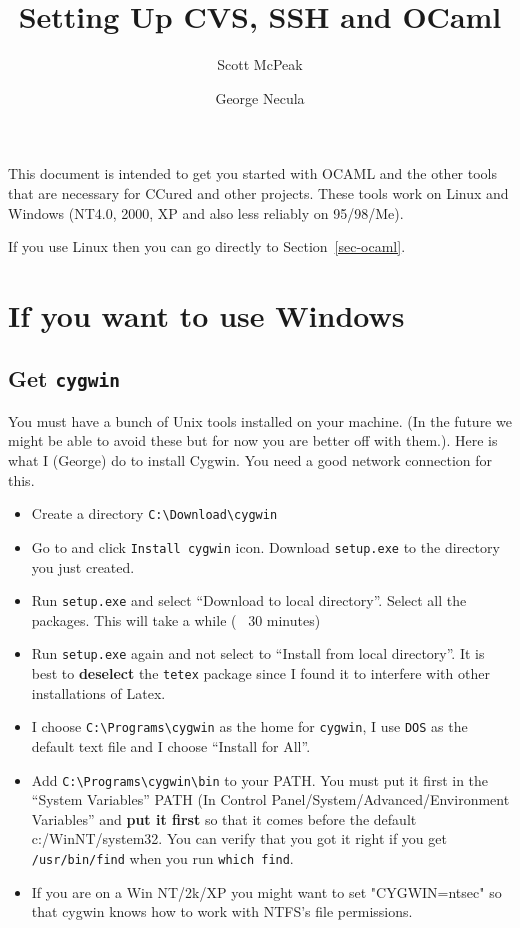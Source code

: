 \documentclass{article}
\title{Setting Up CVS, SSH and OCaml}
\author{Scott McPeak \and George Necula}
\def\t#1{{\tt #1}}
\begin{document}
\maketitle

 This document is intended to get you started with OCAML and the other tools
that are necessary for CCured and other projects. These tools work on Linux
and Windows (NT4.0, 2000, XP and also less reliably on 95/98/Me).

 If you use Linux then you can go directly to Section~\ref{sec-ocaml}.

\section{If you want to use Windows}

 \subsection{Get \t{cygwin}}

 You must have a bunch of Unix tools installed on your machine. (In the future
we might be able to avoid these but for now you are better off with them.).
Here is what I (George) do to install Cygwin. You need a good network
connection for this. 
\begin{itemize}
\item Create a directory \t{C:\backslash Download\backslash cygwin}
\item Go to  and click \t{Install
cygwin} icon. Download \t{setup.exe} to the directory you just created.
\item Run \t{setup.exe} and select ``Download to local directory''. Select all
the packages. This will take a while (~ 30 minutes)
\item Run \t{setup.exe} again and not select to ``Install from local
directory''. It is best to {\bf deselect} the \t{tetex} package since I found
it to interfere with other installations of Latex.
\item I choose \t{C:\backslash Programs\backslash cygwin} 
as the home for \t{cygwin}, I use \t{DOS} as the default text file and I
choose ``Install for All''. 
\item Add \t{C:\backslash Programs\backslash cygwin\backslash bin} to your
PATH. You must put it first in the ``System Variables'' PATH (In Control Panel/System/Advanced/Environment
Variables'' and {\bf put it first} so that it comes before the default
c:/WinNT/system32. You can verify that you got it right if you get
\t{/usr/bin/find} when you run \t{which find}. 
\item If you are on a Win NT/2k/XP you might want to set "CYGWIN=ntsec" so
that cygwin knows how to work with NTFS's file permissions.
\end{itemize}
\end{document}
